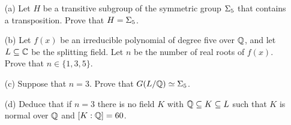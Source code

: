\documentclass[a4paper]{article}
\begin{document}
\begin{problem}%
 \begin{itemize}
  \item[(a)] Let $H$ be a transitive subgroup of the symmetric group
   $\Sigma_5$ that contains a transposition.  Prove that
   $H=\Sigma_5$.  
  \item[(b)] Let $f(x)$ be an irreducible polynomial of degree five
   over ${\mathbb{Q}}$, and let $L\subseteq{\mathbb{C}}$ be the splitting field.  Let $n$ be
   the number of real roots of $f(x)$.  Prove that $n\in\{1,3,5\}$.
  \item[(c)] Suppose that $n=3$.  Prove that
   $G(L/{\mathbb{Q}})\simeq\Sigma_5$.  
  \item[(d)] Deduce that if $n=3$ there is no field $K$ with
   ${\mathbb{Q}}\subseteq K\subseteq L$ such that $K$ is normal over ${\mathbb{Q}}$ and
   $[K:{\mathbb{Q}}]=60$. 
 \end{itemize}
\end{problem}
\end{document}
